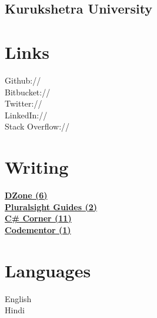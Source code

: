 \documentclass[]{gagan-resume}
\begin{document}
\begin{minipage}[t]{0.33\textwidth}
\subsection{Kurukshetra University}
\sectionsep




\section{Links} 
Github:// \href{https://github.com/sikrigagan}{} \\
Bitbucket:// \href{https://bitbucket.org/sikrigagan}{} \\
Twitter://  \href{https://twitter.com/sikrigagan}{} \\
LinkedIn://  \href{https://www.linkedin.com/in/sikrigagan}{} \\
Stack Overflow://  \href{https://stackoverflow.com/users/4129965/sikrigagan}{}
\sectionsep



\section{Writing} 
\textbf{\href{https://dzone.com/users/2733735/sikrigagan.html}{DZone (6)}}\\
\textbf{\href{https://www.pluralsight.com/guides/author/sikrigagan}{Pluralsight Guides (2)}}\\
\textbf{\href{http://www.c-sharpcorner.com/members/gagan-sikri}{C\# Corner (11)}}\\
\textbf{\href{https://www.codementor.io/sikrigagan}{Codementor (1)}}\\
\sectionsep




\section{Languages}
English \\
Hindi \\
\sectionsep





\end{minipage}
\end{document}
